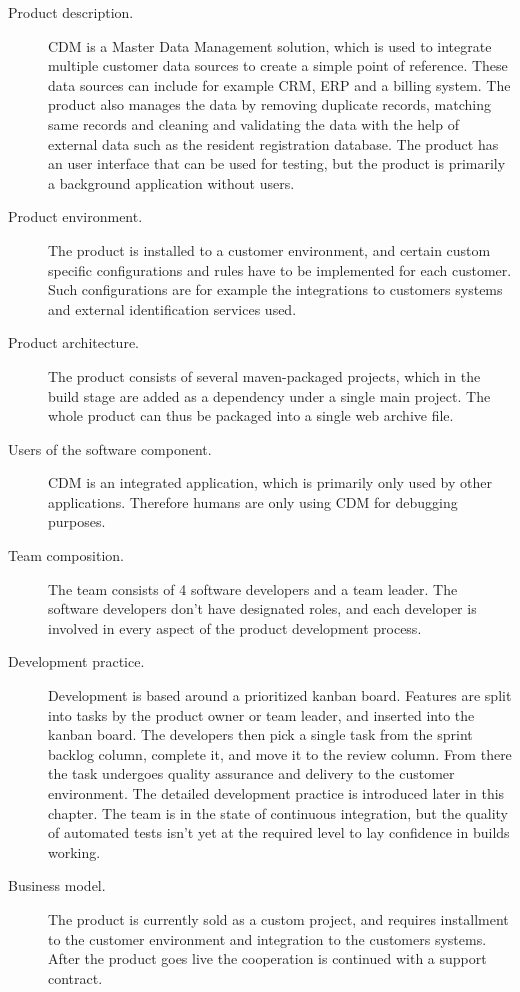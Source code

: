 \documentclass[english]{tktltiki2}
\theoremstyle{definition}
\theoremstyle{remark}
\begin{document}
\begin{description}
  \item[Product description.] CDM is a Master Data Management \cite{loshin2010master} solution, which is used to integrate multiple customer data sources to create a simple point of reference. These data sources can include for example CRM, ERP and a billing system. The product also manages the data by removing duplicate records, matching same records and cleaning and validating the data with the help of external data such as the resident registration database. The product has an user interface that can be used for testing, but the product is primarily a background application without users. 
  \item[Product environment.] The product is installed to a customer environment, and certain custom specific configurations and rules have to be implemented for each customer. Such configurations are for example the integrations to customers systems and external identification services used. 
  \item[Product architecture.] The product consists of several maven-packaged projects, which in the build stage are added as a dependency under a single main project. The whole product can thus be packaged into a single web archive file.
  \item[Users of the software component.] CDM is an integrated application, which is primarily only used by other applications. Therefore humans are only using CDM for debugging purposes.
  \item[Team composition.] The team consists of 4 software developers and a team leader. The software developers don't have designated roles, and each developer is involved in every aspect of the product development process.
  \item[Development practice.] Development is based around a prioritized kanban board. Features are split into tasks by the product owner or team leader, and inserted into the kanban board. The developers then pick a single task from the sprint backlog column, complete it, and move it to the review column. From there the task undergoes quality assurance and delivery to the customer environment. The detailed development practice is introduced later in this chapter. The team is in the state of continuous integration, but the quality of automated tests isn't yet at the required level to lay confidence in builds working. 
  \item[Business model.] The product is currently sold as a custom project, and requires installment to the customer environment and integration to the customers systems. After the product goes live the cooperation is continued with a support contract.

\end{description}
\end{document}
